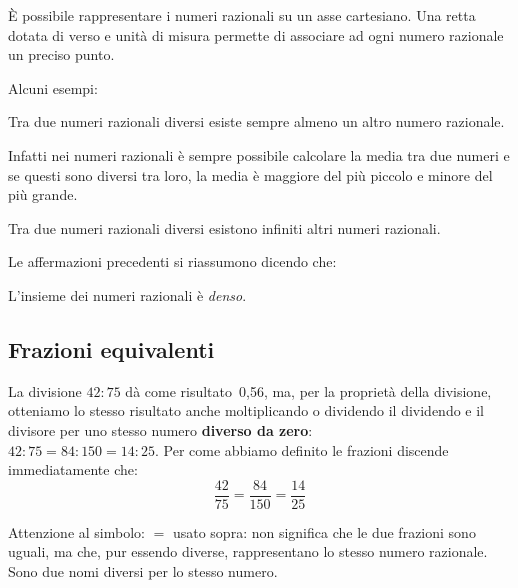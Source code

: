 È possibile rappresentare i numeri razionali su 
un asse cartesiano. Una 
retta dotata di verso e unità di misura permette di associare ad ogni 
numero razionale un preciso punto. 

Alcuni esempi:
{\rettafra}

\begin{teorema}{}{}
 Tra due numeri razionali diversi esiste sempre almeno un altro numero 
razionale.
\end{teorema}

Infatti nei numeri razionali è sempre possibile calcolare la media tra due 
numeri e se questi sono diversi tra loro, la media è maggiore del più 
piccolo e minore del più grande.

\begin{corollario}{}{}
 Tra due numeri razionali diversi esistono infiniti altri numeri razionali.
\end{corollario}

Le affermazioni precedenti si riassumono dicendo che:

\begin{definizione}{}{}
 L'insieme dei numeri razionali è \emph{denso}.
\end{definizione}

\subsection{Frazioni equivalenti}
\label{sub:razionali_equivalenti}

La divisione \(42 : 75 \) dà come risultato~0,56, ma, per la 
proprietà della divisione, otteniamo lo stesso 
risultato anche moltiplicando o dividendo il dividendo e il divisore per 
uno stesso numero \textbf{diverso da zero}:\\
\(42 : 75 = 84 : 150 = 14 : 25\).
Per come abbiamo definito le frazioni discende immediatamente che:\\
\[\dfrac{42}{75} = \dfrac{84}{150} = \dfrac{14}{25}\]
\begin{osservazione}{}{}
Attenzione al simbolo: \(=\) usato sopra: non significa che le due frazioni 
sono uguali, ma che, pur essendo diverse, rappresentano lo stesso numero 
razionale. 
Sono due nomi diversi per lo stesso numero.
\end{osservazione}

